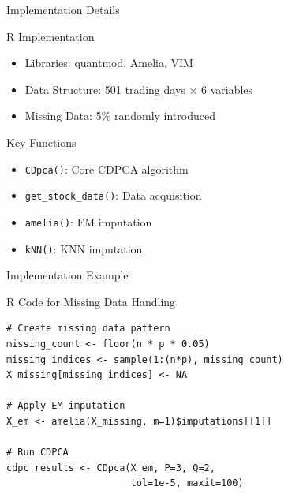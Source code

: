 \documentclass{beamer}
\begin{document}
\begin{frame}{Implementation Details}
    \begin{block}{R Implementation}
        \begin{itemize}
            \item Libraries: quantmod, Amelia, VIM
            \item Data Structure: 501 trading days × 6 variables
            \item Missing Data: 5\% randomly introduced
        \end{itemize}
    \end{block}

    \begin{block}{Key Functions}
        \begin{itemize}
            \item \texttt{CDpca()}: Core CDPCA algorithm
            \item \texttt{get\_stock\_data()}: Data acquisition
            \item \texttt{amelia()}: EM imputation
            \item \texttt{kNN()}: KNN imputation
        \end{itemize}
    \end{block}
\end{frame}

\begin{frame}[fragile]{Implementation Example}
    \begin{block}{R Code for Missing Data Handling}
        \begin{verbatim}
# Create missing data pattern
missing_count <- floor(n * p * 0.05)
missing_indices <- sample(1:(n*p), missing_count)
X_missing[missing_indices] <- NA

# Apply EM imputation
X_em <- amelia(X_missing, m=1)$imputations[[1]]

# Run CDPCA
cdpc_results <- CDpca(X_em, P=3, Q=2,
                      tol=1e-5, maxit=100)
        \end{verbatim}
    \end{block}
\end{frame}
\end{document}
